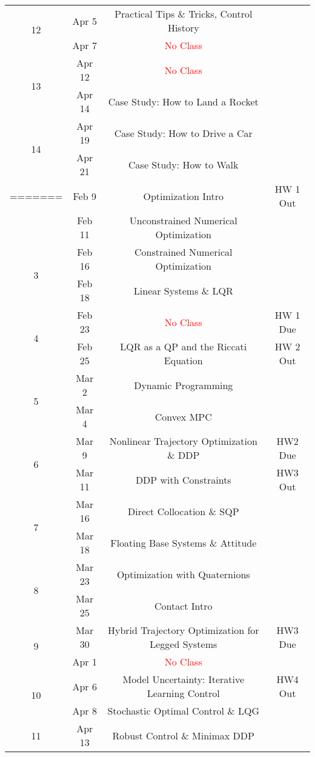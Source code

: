 \documentclass[11pt,letterpaper]{article}
\begin{document}
\begin{tabular}{c|c|c|c}
	 \hline
	\multirow{2}{*}{12}  & Apr 5 & Practical Tips \& Tricks, Control History &   \\
	 & Apr 7 & \textcolor{red}{No Class} &   \\
	 \hline
	\multirow{2}{*}{13}  & Apr 12 & \textcolor{red}{No Class} &  \\
	 & Apr 14 & Case Study: How to Land a Rocket &   \\
	 \hline
	\multirow{2}{*}{14}  & Apr 19 & Case Study: How to Drive a Car &  \\
	 & Apr 21 & Case Study: How to Walk &   \\
=======
	\multirow{2}{*}{2} & Feb 9 & Optimization Intro & HW 1 Out \\
	 & Feb 11 & Unconstrained Numerical Optimization &  \\
	\hline
	\multirow{2}{*}{3}  & Feb 16 & Constrained Numerical Optimization &  \\
	 & Feb 18 & Linear Systems \& LQR &  \\
	\hline
	\multirow{2}{*}{4}  & Feb 23 & \textcolor{red}{No Class} & HW 1 Due \\
	 & Feb 25 & LQR as a QP and the Riccati Equation & HW 2 Out \\
	\hline
	\multirow{2}{*}{5}  & Mar 2 & Dynamic Programming & \\
	 & Mar 4 & Convex MPC &  \\
	\hline
	\multirow{2}{*}{6}  & Mar 9 & Nonlinear Trajectory Optimization \& DDP &   HW2 Due \\
	 & Mar 11 & DDP with Constraints & HW3 Out \\
	\hline
	\multirow{2}{*}{7}  & Mar 16 & Direct Collocation \& SQP  & \\
	 & Mar 18 & Floating Base Systems \& Attitude & \\
	\hline
	\multirow{2}{*}{8}  & Mar 23 & Optimization with Quaternions & \\
	 & Mar 25 & Contact Intro & \\
	\hline
	\multirow{2}{*}{9}  & Mar 30 & Hybrid Trajectory Optimization for Legged Systems & HW3 Due \\
	 & Apr 1 & \textcolor{red}{No Class} &   \\
	\hline
	\multirow{2}{*}{10}  & Apr 6 & Model Uncertainty: Iterative Learning Control &  HW4 Out \\
	 & Apr 8 & Stochastic Optimal Control \& LQG & \\
	 \hline
	\multirow{2}{*}{11}  & Apr 13 & Robust Control \& Minimax DDP &  \\

\end{tabular}
\end{document}
